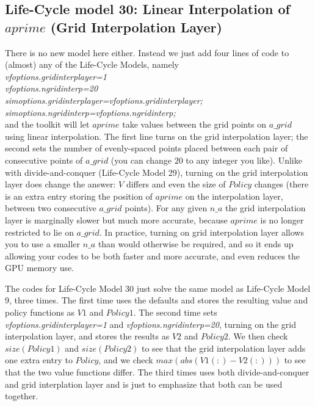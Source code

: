 \subsection{Life-Cycle model 30: Linear Interpolation of $aprime$ (Grid Interpolation Layer)}
There is no new model here either.  Instead we just add four lines of code to (almost) any of the Life-Cycle Models, namely
\\ \textit{vfoptions.gridinterplayer=1}
\\ \textit{vfoptions.ngridinterp=20}
\\ \textit{simoptions.gridinterplayer=vfoptions.gridinterplayer;}
\\ \textit{simoptions.ngridinterp=vfoptions.ngridinterp;}
\\ \noindent and the toolkit will let $aprime$ take values between the grid points on $a\_{}grid$ using linear interpolation. The first line turns on the grid interpolation layer; the second sets the number of evenly-spaced points placed between each pair of consecutive points of $a\_{}grid$ (you can change $20$ to any integer you like). Unlike with divide-and-conquer (Life-Cycle Model 29), turning on the grid interpolation layer does change the answer: $V$ differs and even the size of $Policy$ changes (there is an extra entry storing the position of $aprime$ on the interpolation layer, between two consecutive $a\_{}grid$ points). For any given $n\_{}a$ the grid interpolation layer is marginally slower but much more accurate, because $aprime$ is no longer restricted to lie on $a\_{}grid$. In practice, turning on grid interpolation layer allows you to use a smaller $n\_{}a$ than would otherwise be required, and so it ends up allowing your codes to be both faster and more accurate, and even reduces the GPU memory use.

The codes for Life-Cycle Model 30 just solve the same model as Life-Cycle Model 9, three times. The first time uses the defaults and stores the resulting value and policy functions as $V1$ and $Policy1$. The second time sets \textit{vfoptions.gridinterplayer=1} and \textit{vfoptions.ngridinterp=20}, turning on the grid interpolation layer, and stores the results as $V2$ and $Policy2$. We then check $size(Policy1)$ and $size(Policy2)$ to see that the grid interpolation layer adds one extra entry to $Policy$, and we check $max(abs(V1(:)-V2(:)))$ to see that the two value functions differ. The third times uses both divide-and-conquer and grid interplation layer and is just to emphasize that both can be used together.

